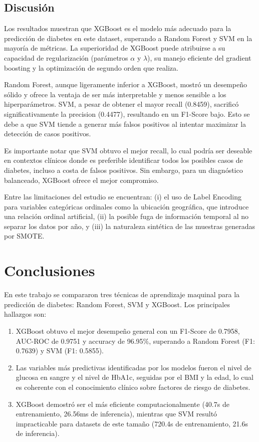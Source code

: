 \documentclass[conference]{IEEEtran}
\begin{document}
\subsection{Discusión}

Los resultados muestran que XGBoost es el modelo más adecuado para la predicción de diabetes en este dataset, superando a Random Forest y SVM en la mayoría de métricas. La superioridad de XGBoost puede atribuirse a su capacidad de regularización (parámetros $\alpha$ y $\lambda$), su manejo eficiente del gradient boosting y la optimización de segundo orden que realiza.

Random Forest, aunque ligeramente inferior a XGBoost, mostró un desempeño sólido y ofrece la ventaja de ser más interpretable y menos sensible a los hiperparámetros. SVM, a pesar de obtener el mayor recall (0.8459), sacrificó significativamente la precision (0.4477), resultando en un F1-Score bajo. Esto se debe a que SVM tiende a generar más falsos positivos al intentar maximizar la detección de casos positivos.

Es importante notar que SVM obtuvo el mejor recall, lo cual podría ser deseable en contextos clínicos donde es preferible identificar todos los posibles casos de diabetes, incluso a costa de falsos positivos. Sin embargo, para un diagnóstico balanceado, XGBoost ofrece el mejor compromiso.

Entre las limitaciones del estudio se encuentran: (i) el uso de Label Encoding para variables categóricas ordinales como la ubicación geográfica, que introduce una relación ordinal artificial, (ii) la posible fuga de información temporal al no separar los datos por año, y (iii) la naturaleza sintética de las muestras generadas por SMOTE.

\section{Conclusiones}

En este trabajo se compararon tres técnicas de aprendizaje maquinal para la predicción de diabetes: Random Forest, SVM y XGBoost. Los principales hallazgos son:

\begin{enumerate}
    \item XGBoost obtuvo el mejor desempeño general con un F1-Score de 0.7958, AUC-ROC de 0.9751 y accuracy de 96.95\%, superando a Random Forest (F1: 0.7639) y SVM (F1: 0.5855).
    \item Las variables más predictivas identificadas por los modelos fueron el nivel de glucosa en sangre y el nivel de HbA1c, seguidas por el BMI y la edad, lo cual es coherente con el conocimiento clínico sobre factores de riesgo de diabetes.
    \item XGBoost demostró ser el más eficiente computacionalmente (40.7s de entrenamiento, 26.56ms de inferencia), mientras que SVM resultó impracticable para datasets de este tamaño (720.4s de entrenamiento, 21.6s de inferencia).
\end{enumerate}
\end{document}
